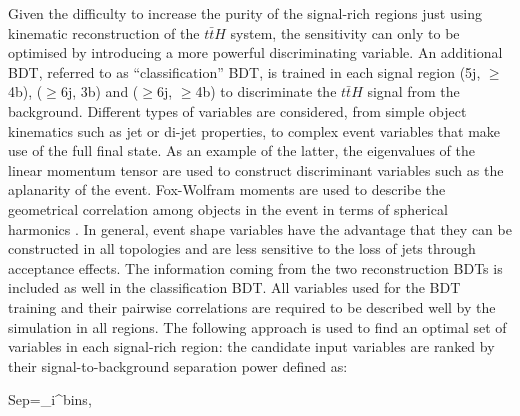 Given the difficulty to increase the purity of the signal-rich regions just using kinematic reconstruction of the $t\bar{t}H$ system, the sensitivity can only to be optimised by introducing a more powerful discriminating variable. An additional BDT, referred to as ``classification'' BDT, is trained in each signal region (5j, $\ge$4b), ($\ge$6j, 3b) and ($\ge$6j, $\ge$4b) to discriminate the $t\bar{t}H$ signal from the background. Different types of variables are considered, from simple object kinematics such as jet \pt or di-jet properties, to complex event variables that make use of the full final state. As an example of the latter, the eigenvalues of the linear momentum tensor \cite{tensor} are used to construct discriminant variables such as the aplanarity of the event. Fox-Wolfram moments are used to describe the geometrical correlation among objects in the event in terms of spherical harmonics \cite{foxW}. In general, event shape variables have the advantage that they can be constructed in all topologies and are less sensitive to the loss of jets through acceptance effects. The information coming from the two reconstruction BDTs is included as well in the classification BDT. 
All variables used for the BDT training and their pairwise correlations are required to be described well by the simulation in all regions.
The following approach is used to find an optimal set of variables in each signal-rich region: the candidate input variables are ranked by their signal-to-background separation power defined as:

\be
{\rm Sep}=\displaystyle\sum_{i}^{\rm bins}, 
\ee

